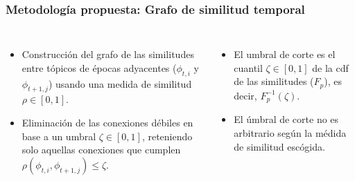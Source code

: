 \documentclass[
	spanish, %
	aspectratio=43, %
	hyperref={pdfencoding=auto,psdextra},
	xcolor={dvipsnames,table,usenames}
]{beamer}
\begin{document}
\begin{frame}
\frametitle{Metodología propuesta: Grafo de similitud temporal}
\begin{columns}[c]
  \begin{itemize}
    \item Construcción del grafo  de las similitudes entre tópicos de épocas adyacentes ($\phi_{t,i}$ y $\phi_{t+1,j}$) usando una medida de similitud $\rho \in [0,1]$.
    \item Eliminación de las conexiones débiles en base a un umbral $\zeta \in [0,1]$, reteniendo solo aquellas conexiones que cumplen $\rho(\phi_{t,i}, \phi_{t+1,j})\leq \zeta$.

  \end{itemize}
		
  \begin{itemize}
    \item El umbral de corte es el cuantil $\zeta \in [0,1]$ de la cdf de las similitudes ($F_{p}$), es decir, $F_{p}^{-1}(\zeta)$.
    \item El úmbral de corte no es arbitrario según la médida de similitud escógida.
  \end{itemize}

\end{columns}




\end{frame}
\end{document}
